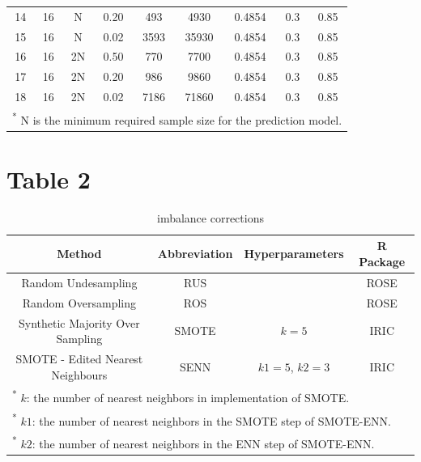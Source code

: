 \documentclass[
]{article}
\begin{document}
\begin{table}[!h]
\begin{tabular}[t]{ccccccccc}
14 & 16 & N & 0.20 & 493 & 4930 & 0.4854 & 0.3 & 0.85\\
  
15 & 16 & N & 0.02 & 3593 & 35930 & 0.4854 & 0.3 & 0.85\\
  
16 & 16 & 2N & 0.50 & 770 & 7700 & 0.4854 & 0.3 & 0.85\\
  
17 & 16 & 2N & 0.20 & 986 & 9860 & 0.4854 & 0.3 & 0.85\\
  
18 & 16 & 2N & 0.02 & 7186 & 71860 & 0.4854 & 0.3 & 0.85\\
\bottomrule
\multicolumn{9}{l}{\rule{0pt}{1em}\textsuperscript{*} N is the minimum required sample size for the prediction model.}\\
\end{tabular}
\end{table}

\newpage

\hypertarget{table-2}{%
\section{Table 2}\label{table-2}}

\begin{table}[!h]

\caption{\label{tab:tab:table} imbalance corrections }
\centering
\begin{tabular}[t]{cccc}
\toprule
Method & Abbreviation & Hyperparameters & R Package\\
\midrule
Random Undesampling & RUS &  & ROSE \cite{rose}\\
\addlinespace
Random Oversampling & ROS &  & ROSE \cite{rose}\\
\addlinespace
Synthetic Majority Over Sampling & SMOTE & $k=5$ & IRIC \cite{iric}\\
\addlinespace
SMOTE - Edited Nearest Neighbours & SENN & $k1=5$, $k2 = 3$ & IRIC \cite{iric}\\
\bottomrule
\multicolumn{4}{l}{\rule{0pt}{1em}\textsuperscript{*}      $k$: the number of nearest neighbors in implementation of SMOTE.}\\
\multicolumn{4}{l}{\rule{0pt}{1em}\textsuperscript{*}     $k1$: the number of nearest neighbors in the SMOTE step of SMOTE-ENN.}\\
\multicolumn{4}{l}{\rule{0pt}{1em}\textsuperscript{*}     $k2$: the number of nearest neighbors in the ENN step of SMOTE-ENN.}\\
\end{tabular}
\end{table}
\end{document}
